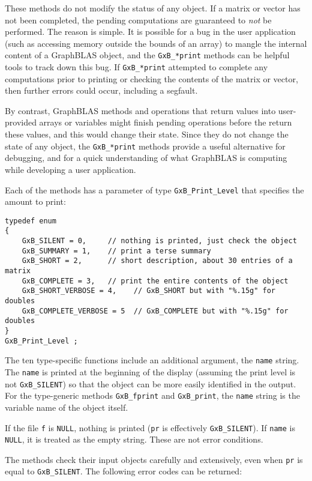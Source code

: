 \documentclass[12pt]{article}
\begin{document}
These methods do not modify the status of any object.  If a matrix or vector
has not been completed, the pending computations are guaranteed to {\em not} be
performed. The reason is simple.  It is possible for a bug in the user
application (such as accessing memory outside the bounds of an array) to mangle
the internal content of a GraphBLAS object, and the \verb'GxB_*print' methods
can be helpful tools to track down this bug.  If \verb'GxB_*print' attempted to
complete any computations prior to printing or checking the contents of the
matrix or vector, then further errors could occur, including a segfault.

By contrast, GraphBLAS methods and operations that return values into
user-provided arrays or variables might finish pending operations before the
return these values, and this would change their state.  Since they do not
change the state of any object, the \verb'GxB_*print' methods provide a useful
alternative for debugging, and for a quick understanding of what GraphBLAS is
computing while developing a user application.

Each of the methods has a parameter of type \verb'GxB_Print_Level' that
specifies the amount to print:

{\footnotesize
\begin{verbatim}
typedef enum
{
    GxB_SILENT = 0,     // nothing is printed, just check the object
    GxB_SUMMARY = 1,    // print a terse summary
    GxB_SHORT = 2,      // short description, about 30 entries of a matrix
    GxB_COMPLETE = 3,   // print the entire contents of the object
    GxB_SHORT_VERBOSE = 4,    // GxB_SHORT but with "%.15g" for doubles
    GxB_COMPLETE_VERBOSE = 5  // GxB_COMPLETE but with "%.15g" for doubles
}
GxB_Print_Level ; \end{verbatim}}

The ten type-specific functions include an additional argument, the
\verb'name' string.  The \verb'name' is printed at the beginning of the display
(assuming the print level is not \verb'GxB_SILENT') so that the object can be
more easily identified in the output.  For the type-generic methods
\verb'GxB_fprint' and \verb'GxB_print', the \verb'name' string is the variable
name of the object itself.

If the file \verb'f' is \verb'NULL', nothing is printed (\verb'pr' is
effectively \verb'GxB_SILENT').  If \verb'name' is \verb'NULL', it is treated
as the empty string.  These are not error conditions.

The methods check their input objects carefully and extensively, even when
\verb'pr' is equal to \verb'GxB_SILENT'.  The following error codes can be
returned:
\end{document}
